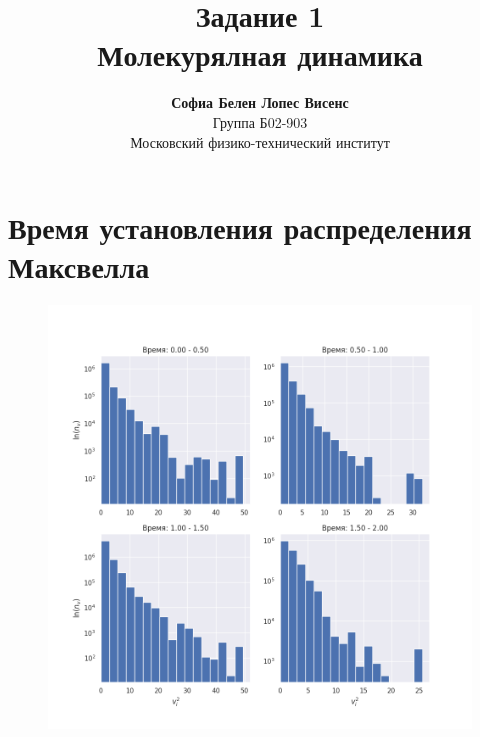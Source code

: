 \documentclass[a4paper,12pt]{report}
\author{\textbf{Софиа Белен Лопес Висенс}\\Группа Б02-903\\ \large Московский физико-технический институт}
\title{\textbf{Задание 1}\\Молекурялная динамика}
\date{}
\begin{document}
\maketitle
\pagebreak

\section{Время установления распределения Максвелла}

\begin{figure}[H]
    \centering
    \includegraphics[width=\textwidth]{../../media/velocities1.png}
\end{figure}
\end{document}
